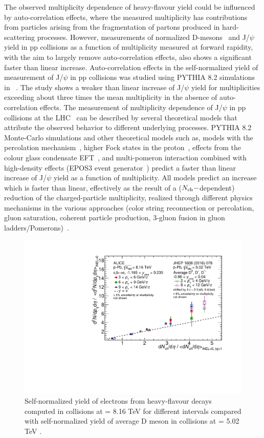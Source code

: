 The observed multiplicity dependence of heavy-flavour yield could be influenced by auto-correlation effects, where the measured multiplicity has contributions from particles arising from the fragmentation of partons produced in hard-scattering processes. However, measurements of normalized D-mesons~\cite{Adam:2015ota} and J/$\psi$~\cite{Acharya:2020pit} yield in pp collisions as a function of multiplicity measured at forward rapidity, with the aim to largely remove auto-correlation effects, also shows a significant faster than linear increase. Auto-correlation effects in the self-normalized yield of measurement of J/$\psi$ in pp collisions was studied using PYTHIA 8.2 simulations in ~\cite{Weber:2018ddv}. The study shows a weaker than linear increase of J/$\psi$ yield for multiplicities exceeding about three times the mean multiplicity in the absence of auto-correlation effects. The measurement of multiplicity dependence of J/$\psi$ in pp collisions at the LHC~\cite{Acharya:2020pit} can be described by several theoretical models that attribute the observed behavior to different underlying processes. PYTHIA 8.2 Monte-Carlo simulations and other theoretical models such as, models with the percolation mechanism~\cite{Ferreiro:2012fb}, higher Fock states in the proton~\cite{Kopeliovich:2013yfa}, effects from the colour glass condensate EFT~\cite{Ma:2018bax}, and multi-pomeron interaction combined with high-density effects (EPOS3 event generator~\cite{Werner:2013tya}) predict a faster than linear increase of J/$\psi$ yield as a function of multiplicity. All models predict an increase which is faster than linear, effectively as the result of a ($N_{\rm{ch}}-$dependent) reduction of the charged-particle multiplicity, realized through different physics mechanisms in the various approaches (color string reconnection or
percolation, gluon saturation, coherent particle production, 3-gluon fusion in gluon ladders/Pomerons)~\cite{Acharya:2020pit}.


\begin{figure}[!ht]
\centering
\includegraphics[width=0.6\linewidth]{figures/Results/HFE_pPb/2018-May-09-HFECompWithDMeson_pPb8TeV.pdf}
\caption{Self-normalized yield of electrons from heavy-flavour decays computed in \pPb collisions at \sqrtsNN = 8.16 TeV for different \pt intervals compared with self-normalized yield of average D meson in \pPb collisions at \sqrtsNN = 5.02 TeV .}
      \label{Fig:SNP_CompOtherPart_pPb}
\end{figure}

